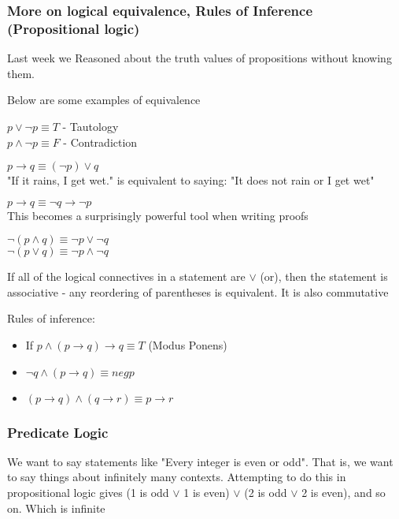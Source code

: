 \documentclass[11pt]{scrartcl}
\begin{document}
\subsubsection{More on logical equivalence, Rules of Inference (Propositional logic)}
\begin{remark}[Review]
    Last week we Reasoned about the truth values of propositions without knowing them.
\end{remark}
Below are some examples of equivalence
\begin{example}[1]
    $p \vee \neg p \equiv T$ - Tautology\\
    $p \wedge \neg p \equiv F$ - Contradiction 
\end{example}
\begin{example}[2]
    $p \rightarrow q \equiv (\neg p) \vee q$\\
    "If it rains, I get wet." is equivalent to saying: "It does not rain or I get wet"
\end{example}
\begin{example}[3 - Contrapositive]
    $p\rightarrow q \equiv \neg q \rightarrow \neg p$\\ This becomes a surprisingly powerful tool when writing proofs
\end{example}
\begin{example}
    $\neg(p \wedge q) \equiv \neg p\vee \neg q$\\
    $\neg(p\vee q) \equiv \neg p \wedge \neg q$
\end{example}
\begin{remark}
    If all of the logical connectives in a statement are $\vee$ (or), then the statement is associative - any reordering of parentheses is equivalent.  It is also commutative
\end{remark}
Rules of inference: \begin{itemize}
    \item If $p\wedge (p\rightarrow q) \rightarrow q \equiv T$ (Modus Ponens)
    \item $\neg q \wedge (p\rightarrow q) \equiv neg p$
    \item $(p \rightarrow q) \wedge (q\rightarrow r) \equiv p\rightarrow r$
\end{itemize}
\subsubsection{Predicate Logic}
\begin{remark}[Motivation]
We want to say statements like "Every integer is even or odd".  That is, we want to say things about infinitely many contexts.  Attempting to do this in propositional logic gives (1 is odd $\vee$ 1 is even) $\vee$ (2 is odd $\vee$ 2 is even), and so on.  Which is infinite
\end{remark}
\end{document}
